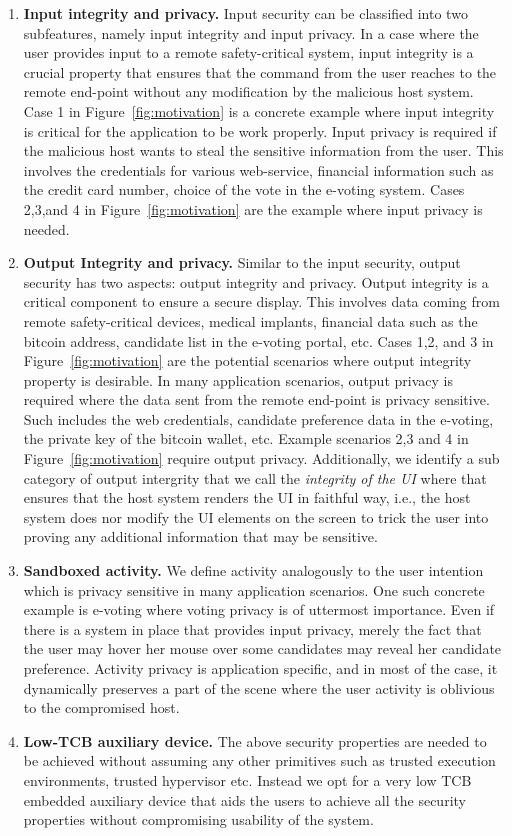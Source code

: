 \begin{enumerate}
  \item \textbf{Input integrity and privacy.} Input security can be classified into two subfeatures, namely input integrity and input privacy. In a case where the user provides input to a remote safety-critical system, input integrity is a crucial property that ensures that the command from the user reaches to the remote end-point without any modification by the malicious host system. Case 1 in Figure~\ref{fig:motivation} is a concrete example where input integrity is critical for the application to be work properly. Input privacy is required if the malicious host wants to steal the sensitive information from the user. This involves the credentials for various web-service, financial information such as the credit card number, choice of the vote in the e-voting system. Cases 2,3,and 4 in Figure~\ref{fig:motivation} are the example where input privacy is needed.
  \item \textbf{Output Integrity and privacy.} Similar to the input security, output security has two aspects: output integrity and privacy. Output integrity is a critical component to ensure a secure display. This involves data coming from remote safety-critical devices, medical implants, financial data such as the bitcoin address, candidate list in the e-voting portal, etc. Cases 1,2, and 3 in Figure~\ref{fig:motivation} are the potential scenarios where output integrity property is desirable. In many application scenarios, output privacy is required where the data sent from the remote end-point is privacy sensitive. Such includes the web credentials, candidate preference data in the e-voting, the private key of the bitcoin wallet, etc. Example scenarios 2,3 and 4 in Figure~\ref{fig:motivation} require output privacy. Additionally, we identify a sub category of output intergrity  that we call the \emph{integrity of the UI} where that ensures that the host system renders the UI in faithful way, i.e., the host system does nor modify the UI elements on the screen to trick the user into proving any additional information that may be sensitive.
  
  \item \textbf{Sandboxed activity.} We define activity analogously to the user intention which is privacy sensitive in many application scenarios. One such concrete example is e-voting where voting privacy is of uttermost importance. Even if there is a system in place that provides input privacy, merely the fact that the user may hover her mouse over some candidates may reveal her candidate preference. Activity privacy is application specific, and in most of the case, it dynamically preserves a part of the scene where the user activity is oblivious to the compromised host. 
  \item\textbf{Low-TCB auxiliary device.} The above security properties are needed to be achieved without assuming any other primitives such as trusted execution environments, trusted hypervisor etc. Instead we opt for a very low TCB embedded auxiliary device that aids the users to achieve all the security properties without compromising usability of the system. 
\end{enumerate}

